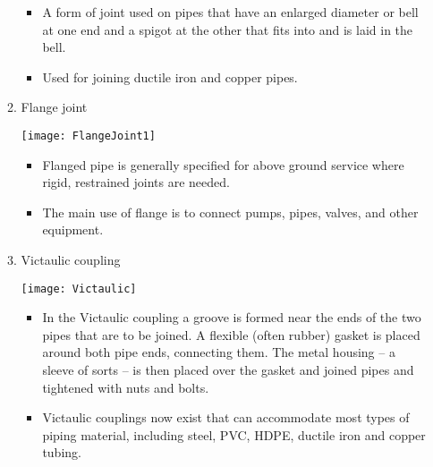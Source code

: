 \begin{itemize}
\begin{enumerate}
\begin{minipage}{0.55\textwidth}
\begin{itemize}
\item A form of joint used on pipes that have an enlarged diameter or bell at one end and a spigot at the other that fits into and is laid in the bell.
\item Used for joining ductile iron and copper pipes.
\end{itemize}
\end{minipage}
\vspace{0.3cm}
\item Flange joint \\
\begin{minipage}{0.3\textwidth}
\texttt{[image: FlangeJoint1]}
\end{minipage}
\begin{minipage}{0.1\textwidth}
\end{minipage}
\begin{minipage}{0.55\textwidth}
\begin{itemize}
\item Flanged pipe is generally specified for above ground service where rigid, restrained joints are needed.
\item The main use of flange is to connect pumps, pipes, valves, and other equipment.
\end{itemize}
\end{minipage}
\vspace{0.3cm}
\item Victaulic coupling \\
\begin{minipage}{0.3\textwidth}
\texttt{[image: Victaulic]}
\end{minipage}
\begin{minipage}{0.1\textwidth}
\end{minipage}
\begin{minipage}{0.55\textwidth}
\begin{itemize}
\item In the Victaulic coupling a groove is formed near the ends of the two pipes that are to be joined. A flexible (often rubber) gasket is placed around both pipe ends, connecting them. The metal housing – a sleeve of sorts – is then placed over the gasket and joined pipes and tightened with nuts and bolts.
\item Victaulic couplings now exist that can accommodate most types of piping material, including steel, PVC, HDPE, ductile iron and copper tubing.
\end{itemize}
\end{minipage}
\end{enumerate}
\end{itemize}
\vspace{0.3cm}
